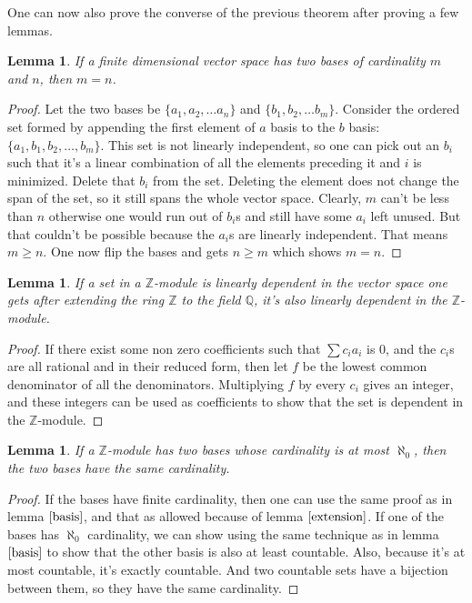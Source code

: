 \documentclass[12pt, titlepage]{article}
\newtheorem{lem}[thm]{Lemma}
\theoremstyle{definition}
\begin{document}
One can now also prove the converse of the previous theorem after proving a few lemmas.

\begin{lem}\label{basis}\cite{halmos}
If a finite dimensional vector space has two bases of cardinality $m$ and $n$, then $m=n$.
\end{lem}

\begin{proof}
Let the two bases be $\{a_1, a_2 ,\ldots a_n\}$ and $\{b_1, b_2, \ldots b_m\}$. Consider the ordered set formed by appending the first element of $a$ basis to the $b$ basis: $\{a_1, b_1, b_2, \ldots, b_m\}$. This set is not linearly independent, so one can pick out an $b_i$ such that it's a linear combination of all the elements preceding it and $i$ is minimized. Delete that $b_i$ from the set. Deleting the element does not change the span of the set, so it still spans the whole vector space. Clearly, $m$ can't be less than $n$ otherwise one would run out of $b_i$s and still have some $a_i$ left unused. But that couldn't be possible because the $a_i$s are linearly independent. That means $m \geq n$. One now flip the bases and gets $n \geq m$ which shows $m=n$.
\end{proof}

\begin{lem}\label{extension}
If a set in a $\mathbb{Z}$-module is linearly dependent in the vector space one gets after extending the ring $\mathbb{Z}$ to the field $\mathbb{Q}$, it's also linearly dependent in the $\mathbb{Z}$-module.
\end{lem}

\begin{proof}
If there exist some non zero coefficients such that $\sum c_ia_i$ is $0$, and the $c_i$s are all rational and in their reduced form, then let $f$ be the lowest common denominator of all the denominators. Multiplying $f$ by every $c_i$ gives an integer, and these integers can be used as coefficients to show that the set is dependent in the $\mathbb{Z}$-module.
\end{proof}

\begin{lem}
If a $\mathbb{Z}$-module has two bases whose cardinality is at most $\aleph_0$, then the two bases have the same cardinality.
\end{lem}

\begin{proof}
If the bases have finite cardinality, then one can use the same proof as in lemma $\autoref{basis}$, and that as allowed because of lemma $\autoref{extension}$. If one of the bases has $\aleph_0$ cardinality, we can show using the same technique as in lemma $\autoref{basis}$ to show that the other basis is also at least countable. Also, because it's at most countable, it's exactly countable. And two countable sets have a bijection between them, so they have the same cardinality.
\end{proof}
\end{document}
